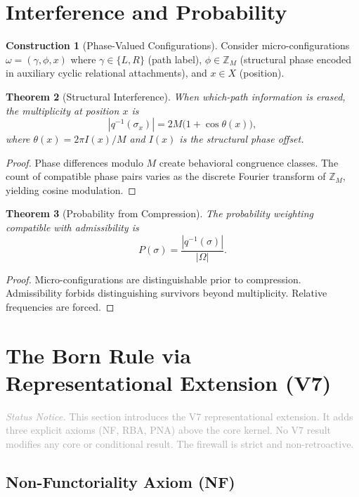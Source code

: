\documentclass[11pt,a4paper]{article}
\newtheorem{theorem}{Theorem}[section]
\theoremstyle{definition}
\newtheorem{construction}[theorem]{Construction}
\theoremstyle{remark}
\newcommand{\statusnotice}[1]{%
  \medskip\noindent\textcolor{darkgray}{\textit{Status Notice.} #1}\medskip
}
\begin{document}
\section{Interference and Probability}\label{sec:interf}

\begin{construction}[Phase-Valued Configurations]\label{con:phase}
Consider micro-configurations $\omega = (\gamma, \phi, x)$ where $\gamma \in \{L, R\}$ (path label), $\phi \in \mathbb{Z}_M$ (structural phase encoded in auxiliary cyclic relational attachments), and $x \in X$ (position).
\end{construction}

\begin{theorem}[Structural Interference]\label{thm:interf}
When which-path information is erased, the multiplicity at position $x$ is
\[
  |q^{-1}(\sigma_x)| = 2M\bigl(1 + \cos\theta(x)\bigr),
\]
where $\theta(x) = 2\pi I(x)/M$ and $I(x)$ is the structural phase offset.
\end{theorem}
\begin{proof}
Phase differences modulo $M$ create behavioral congruence classes. The count of compatible phase pairs varies as the discrete Fourier transform of $\mathbb{Z}_M$, yielding cosine modulation.
\end{proof}

\begin{theorem}[Probability from Compression]\label{thm:prob}
The probability weighting compatible with admissibility is
\[
  P(\sigma) = \frac{|q^{-1}(\sigma)|}{|\Omega|}.
\]
\end{theorem}
\begin{proof}
Micro-configurations are distinguishable prior to compression. Admissibility forbids distinguishing survivors beyond multiplicity. Relative frequencies are forced.
\end{proof}

\section{The Born Rule via Representational Extension (V7)}\label{sec:born}

\statusnotice{This section introduces the V7 representational extension. It adds three explicit axioms (NF, RBA, PNA) above the core kernel. No V7 result modifies any core or conditional result. The firewall is strict and non-retroactive.}

\subsection{Non-Functoriality Axiom (NF)}
\end{document}
